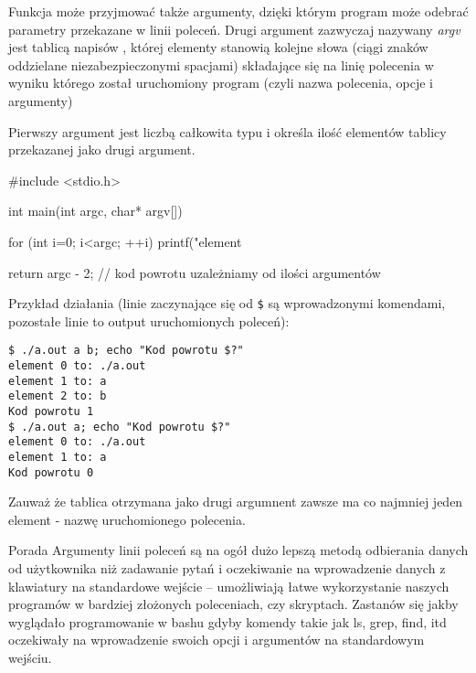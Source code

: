 Funkcja  może przyjmować także argumenty, dzięki którym program może odebrać parametry przekazane w linii poleceń.
Drugi argument zazwyczaj nazywany \textit{argv} jest tablicą napisów ,
	której elementy stanowią kolejne słowa (ciągi znaków oddzielane niezabezpieczonymi spacjami) składające się na linię polecenia w wyniku którego został uruchomiony program (czyli nazwa polecenia, opcje i argumenty)

Pierwszy argument jest liczbą całkowita typu  i określa ilość elementów tablicy przekazanej jako drugi argument.

\begin{CodeFrame*}[c]{}
#include <stdio.h>

int main(int argc, char* argv[]) {
	for (int i=0; i<argc; ++i)
		printf("element %
	
	return argc - 2; // kod powrotu uzależniamy od ilości argumentów
}
\end{CodeFrame*}

Przykład działania (linie zaczynające się od \Verb#$# są wprowadzonymi komendami, pozostałe linie to output uruchomionych poleceń):
\begin{Verbatim}
$ ./a.out a b; echo "Kod powrotu $?"
element 0 to: ./a.out
element 1 to: a
element 2 to: b
Kod powrotu 1
$ ./a.out a; echo "Kod powrotu $?"
element 0 to: ./a.out
element 1 to: a
Kod powrotu 0
\end{Verbatim}

Zauważ że tablica otrzymana jako drugi argumnent zawsze ma co najmniej jeden element - nazwę uruchomionego polecenia.

\begin{ProTip}{Porada}
Argumenty linii poleceń są na ogół dużo lepszą metodą odbierania danych od użytkownika niż zadawanie pytań i oczekiwanie na wprowadzenie danych z klawiatury na standardowe wejście – umożliwiają łatwe wykorzystanie naszych programów w bardziej złożonych poleceniach, czy skryptach. Zastanów się jakby wyglądało programowanie w bashu gdyby komendy takie jak ls, grep, find, itd oczekiwały na wprowadzenie swoich opcji i argumentów na standardowym wejściu.
\end{ProTip}
